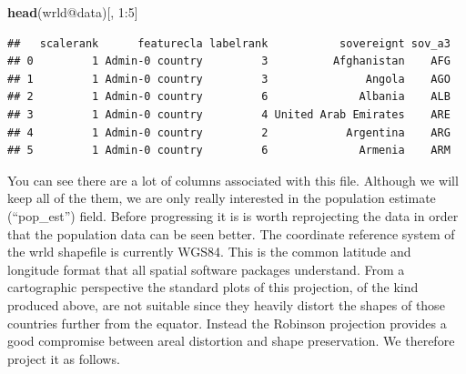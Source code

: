 \documentclass[]{article}
\newenvironment{Shaded}{}{}
\newcommand{\KeywordTok}[1]{\textcolor[rgb]{0.00,0.44,0.13}{\textbf{{#1}}}}
\newcommand{\DecValTok}[1]{\textcolor[rgb]{0.25,0.63,0.44}{{#1}}}
\newcommand{\NormalTok}[1]{{#1}}
\begin{document}
\begin{Shaded}
\begin{Highlighting}[]
\KeywordTok{head}\NormalTok{(wrld@data)[, }\DecValTok{1}\NormalTok{:}\DecValTok{5}\NormalTok{]}
\end{Highlighting}
\end{Shaded}
\begin{verbatim}
##   scalerank      featurecla labelrank           sovereignt sov_a3
## 0         1 Admin-0 country         3          Afghanistan    AFG
## 1         1 Admin-0 country         3               Angola    AGO
## 2         1 Admin-0 country         6              Albania    ALB
## 3         1 Admin-0 country         4 United Arab Emirates    ARE
## 4         1 Admin-0 country         2            Argentina    ARG
## 5         1 Admin-0 country         6              Armenia    ARM
\end{verbatim}
You can see there are a lot of columns associated with this file.
Although we will keep all of the them, we are only really interested in
the population estimate (``pop\_est'') field. Before progressing it is
is worth reprojecting the data in order that the population data can be
seen better. The coordinate reference system of the wrld shapefile is
currently WGS84. This is the common latitude and longitude format that
all spatial software packages understand. From a cartographic
perspective the standard plots of this projection, of the kind produced
above, are not suitable since they heavily distort the shapes of those
countries further from the equator. Instead the Robinson projection
provides a good compromise between areal distortion and shape
preservation. We therefore project it as follows.
\end{document}
